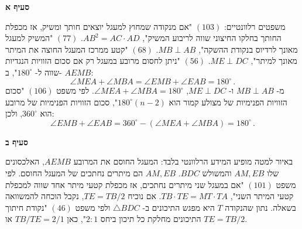 \textbf{סעיף א}

משפטים רלוונטיים: 
$(103)$
"אם מנקודה שמחוץ למעגל יוצאים חותך ומשיק, אז מכפלת החותך בחלקו החיצוני שווה לריבוע המשיק",
$AB^2=AC\cdot AD$.
$(77)$
"המשיק למעגל מאונך לרדיוס בנקודת ההשקה",
$MB \perp AB$. 
$(68)$
"קטע ממרכז המעגל החוצה את המיתר מאונך למיתר",
$ME\perp DC$.
$(56)$
"ניתן לחסום מרובע במעגל רק אם סכום הזוויות הנגדיות שווה ל-%
$180^\circ$",
ב-%
$AEMB$:
\[
\angle MEA+\angle MBA=\angle EMB+\angle EAB=180^\circ\,.
\]
מ-%
$MB \perp AB$
ו-%
$ME\perp DC$,
$\angle MEA + \angle MBA = 180^\circ$.
לפי משפט
$(106)$
"סכום הזוויות הפנימיות של מצולע קמור הוא
$180^\circ(n-2)$",
סכום הזוויות הפנימיות של מרובע הוא 
$360^\circ$,
ולכן:
\[
\angle EMB + \angle EAB = 360^\circ -(\angle MEA + \angle MBA) = 180^\circ\,.
\]
\vspace{-4ex}
\begin{center}
\end{center}

\np

\textbf{סעיף ב}

באיור למטה מופיע המידע הרלוונטי בלבד: המעגל החוסם את המרובע
$AEMB$,
האלכסונים שלו
$AM,EB$
והמשולש
$BDC$.
$AM,EB$
הם מיתרים נחתכים של המעגל החוסם. לפי משפט
$(101)$
"אם במעגל שני מיתרים נחתכים, אז מכפלת קטעי מיתר אחד שווה למכפלת קטעי המיתר השני",
$TB\cdot TE=MT\cdot TA$.
אם נוכיח
$TE=TB/2$,
נקבל הוכחה להמשוואה בשאלה.
נתון שהנקודה
$T$
היא מפגש התיכונים ב-%
$\triangle BDC$
ולפי משפט
$(46)$
"נקודת חיתוך התיכונים מחלקת כל תיכון ביחס
$2:1$",
כאן
$TB/TE=2/1$
או
$TE=TB/2$.

